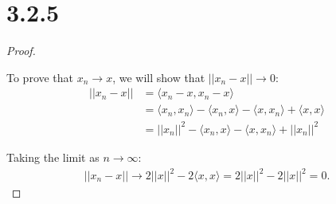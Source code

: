 \documentclass{article}
\begin{document}
\section*{3.2.5}
\begin{proof}
  $ $

  To prove that $x_n \to x$, we will show that $||x_n - x|| \to 0$:
  \begin{align*}
    ||x_n - x|| 
    &= \langle x_n - x, x_n -x \rangle \\
    &= \langle x_n, x_n \rangle
    - \langle x_n, x \rangle
    - \langle x, x_n \rangle
    + \langle x, x \rangle \\
    &= ||x_n||^2
    - \langle x_n, x \rangle
    - \langle x, x_n \rangle
    + ||x_n||^2
  \end{align*}

  Taking the limit as $n \to \infty$:
  \begin{align*}
    ||x_n - x|| 
    \to
    2 ||x||^2
    - 2\langle x, x \rangle = 2 ||x||^2 - 2 ||x||^2 = 0.
  \end{align*}
\end{proof}
\end{document}
